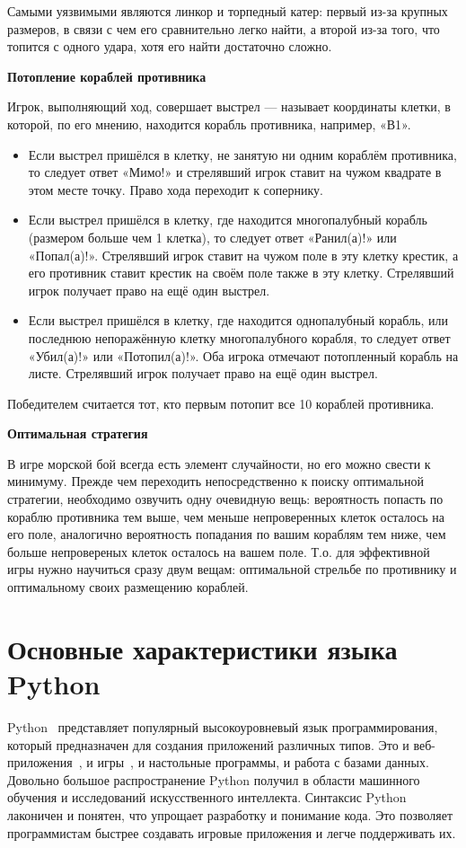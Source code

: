 Самыми уязвимыми являются линкор и торпедный катер: первый из-за крупных размеров, в связи с чем его сравнительно легко найти, а второй из-за того, что топится с одного удара, хотя его найти достаточно сложно.

\textbf{Потопление кораблей противника}~\cite{p13}

Игрок, выполняющий ход, совершает выстрел — называет координаты клетки, в которой, по его мнению, находится корабль противника, например, «В1».
\begin{itemize}
\item Если выстрел пришёлся в клетку, не занятую ни одним кораблём противника, то следует ответ «Мимо!» и стрелявший игрок ставит на чужом квадрате в этом месте точку. Право хода переходит к сопернику.
\item Если выстрел пришёлся в клетку, где находится многопалубный корабль (размером больше чем 1 клетка), то следует ответ «Ранил(а)!» или «Попал(а)!». Стрелявший игрок ставит на чужом поле в эту клетку крестик, а его противник ставит крестик на своём поле также в эту клетку. Стрелявший игрок получает право на ещё один выстрел.
\item Если выстрел пришёлся в клетку, где находится однопалубный корабль, или последнюю непоражённую клетку многопалубного корабля, то следует ответ «Убил(а)!» или «Потопил(а)!». Оба игрока отмечают потопленный корабль на листе. Стрелявший игрок получает право на ещё один выстрел.
\end{itemize}
Победителем считается тот, кто первым потопит все 10 кораблей противника.

\textbf{Оптимальная стратегия}~\cite{p6}

В игре морской бой всегда есть элемент случайности, но его можно свести к минимуму. Прежде чем переходить непосредственно к поиску оптимальной стратегии, необходимо озвучить одну очевидную вещь: вероятность попасть по кораблю противника тем выше, чем меньше непроверенных клеток осталось на его поле, аналогично вероятность попадания по вашим кораблям тем ниже, чем больше непровереных клеток осталось на вашем поле. Т.о. для эффективной игры нужно научиться сразу двум вещам: оптимальной стрельбе по противнику и оптимальному своих размещению кораблей.

\section{\label{sec:ch01/sec02}Основные характеристики языка Python}

Python~\cite{p2} представляет популярный высокоуровневый язык программирования, который предназначен для создания приложений различных типов. Это и веб-приложения~\cite{p9}, и игры~\cite{p8}, и настольные программы, и работа с базами данных. Довольно большое распространение Python получил в области машинного обучения и исследований искусственного интеллекта. Синтаксис Python лаконичен и понятен, что упрощает разработку и понимание кода. Это позволяет программистам быстрее создавать игровые приложения и легче поддерживать их.

